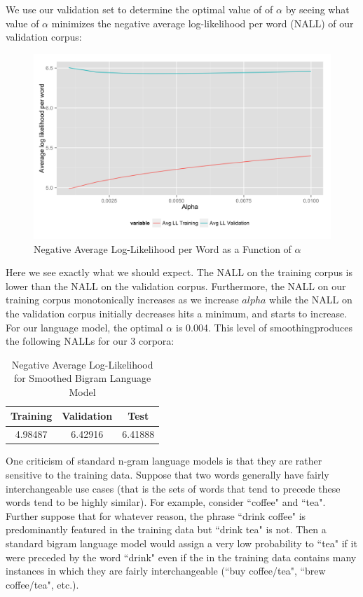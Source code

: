 \documentclass[fleqn,12pt]{SelfArx} %
\begin{document}
We use our validation set to determine the optimal value of of $\alpha$ by seeing what value of $\alpha$ minimizes the negative average log-likelihood per word (NALL) of our validation corpus:
\begin{figure}[ht]\centering
\includegraphics[width=\linewidth]{bigram_add_a.png}
\caption{Negative Average Log-Likelihood per Word as a Function of $\alpha$}
\label{fig:fre_hist}
\end{figure}

Here we see exactly what we should expect. The NALL on the training corpus is lower than the NALL on the validation corpus. Furthermore, the NALL on our training corpus monotonically increases as we increase $alpha$ while the NALL on the validation corpus initially decreases hits a minimum, and starts to increase. For our language model, the optimal $\alpha$ is 0.004. This level of smoothingproduces the following NALLs for our 3 corpora:

\begin{table}[hbt]
\caption{Negative Average Log-Likelihood for Smoothed Bigram Language Model}
\centering
\begin{tabular}{ccc}
\toprule
Training &  Validation & Test\\
\midrule
4.98487 & 6.42916 &  6.41888\\
\bottomrule
\end{tabular}
\end{table}

One criticism of standard n-gram language models is that they are rather sensitive to the training data. Suppose that two words generally have fairly interchangeable use cases (that is the sets of words that tend to precede these words tend to be highly similar). For example, consider ``coffee" and ``tea". Further suppose that for whatever reason, the phrase ``drink coffee" is predominantly featured in the training data but ``drink tea" is not. Then a standard bigram language model would assign a very low probability to ``tea" if it were preceded by the word ``drink" even if the in the training data contains many instances in which they are fairly interchangeable (``buy coffee/tea", ``brew coffee/tea", etc.).
\end{document}
